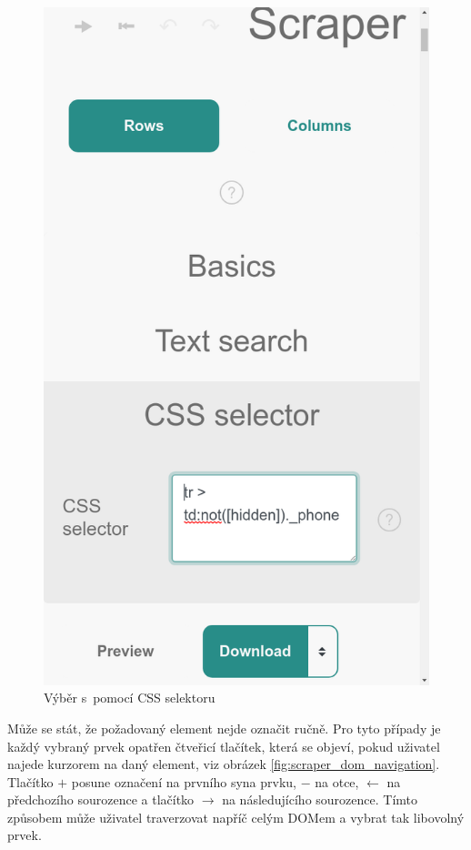 \documentclass[thesis=B,czech]{FITthesis}[2012/06/26]
\begin{document}
\begin{figure}
\begin{minipage}{.5\linewidth}
		\includegraphics[width=.75\linewidth]{images/Scraper_css_selector.png}
		\caption[Výběr s~pomocí CSS selektoru]{Výběr s~pomocí CSS \newline selektoru}
		\label{fig:scraper_css_selector}
	\end{minipage}
\end{figure}

\newpage
Může se stát, že požadovaný element nejde označit ručně. Pro tyto případy je každý vybraný prvek opatřen čtveřicí tlačítek, která se objeví, pokud uživatel najede kurzorem na daný element, viz obrázek \ref{fig:scraper_dom_navigation}. Tlačítko \textsf{$+$} posune označení na prvního syna prvku, \textsf{$-$} na otce, \textsf{$\leftarrow$} na předchozího sourozence a tlačítko \textsf{$\rightarrow$} na následujícího sourozence. Tímto způsobem může uživatel traverzovat napříč celým DOMem a vybrat tak libovolný prvek.
\end{document}
